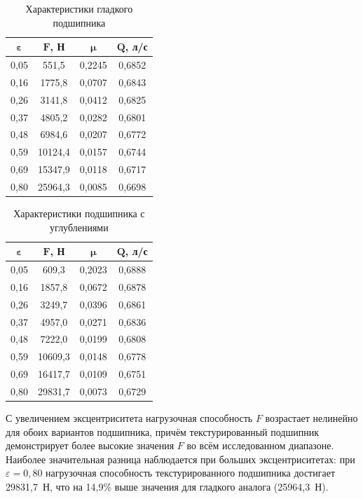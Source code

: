 \begin{table}[H]
\small
\centering
\caption{Характеристики гладкого подшипника}
\label{tab:smooth_results}
\begin{tabular}{|c|c|c|c|}
\hline
$\boldsymbol{\varepsilon}$ & $\boldsymbol{F}$\textbf{, Н} & $\boldsymbol{\mu}$ & $\boldsymbol{Q}$\textbf{, л/с} \\
\hline
0{,}05 & 551{,}5 & 0{,}2245 & 0{,}6852 \\
\hline
0{,}16 & 1775{,}8 & 0{,}0707 & 0{,}6843 \\
\hline
0{,}26 & 3141{,}8 & 0{,}0412 & 0{,}6825 \\
\hline
0{,}37 & 4805{,}2 & 0{,}0282 & 0{,}6801 \\
\hline
0{,}48 & 6984{,}6 & 0{,}0207 & 0{,}6772 \\
\hline
0{,}59 & 10124{,}4 & 0{,}0157 & 0{,}6744 \\
\hline
0{,}69 & 15347{,}9 & 0{,}0118 & 0{,}6717 \\
\hline
0{,}80 & 25964{,}3 & 0{,}0085 & 0{,}6698 \\
\hline
\end{tabular}
\end{table}

\begin{table}[H]
\small
\centering
\caption{Характеристики подшипника с \varDimpleTypeGenitive{} углублениями}
\label{tab:textured_results}
\begin{tabular}{|c|c|c|c|}
\hline
$\boldsymbol{\varepsilon}$ & $\boldsymbol{F}$\textbf{, Н} & $\boldsymbol{\mu}$ & $\boldsymbol{Q}$\textbf{, л/с} \\
\hline
0{,}05 & 609{,}3 & 0{,}2023 & 0{,}6888 \\
\hline
0{,}16 & 1857{,}8 & 0{,}0672 & 0{,}6878 \\
\hline
0{,}26 & 3249{,}7 & 0{,}0396 & 0{,}6861 \\
\hline
0{,}37 & 4957{,}0 & 0{,}0271 & 0{,}6836 \\
\hline
0{,}48 & 7222{,}0 & 0{,}0199 & 0{,}6808 \\
\hline
0{,}59 & 10609{,}3 & 0{,}0148 & 0{,}6778 \\
\hline
0{,}69 & 16417{,}7 & 0{,}0109 & 0{,}6751 \\
\hline
0{,}80 & 29831{,}7 & 0{,}0073 & 0{,}6729 \\
\hline
\end{tabular}
\end{table}

С увеличением эксцентриситета нагрузочная способность $F$ возрастает нелинейно для обоих вариантов подшипника, причём текстурированный подшипник демонстрирует более высокие значения $F$ во всём исследованном диапазоне. Наиболее значительная разница наблюдается при больших эксцентриситетах: при $\varepsilon = 0{,}80$ нагрузочная способность текстурированного подшипника достигает 29831{,}7~Н, что на 14{,}9\% выше значения для гладкого аналога (25964{,}3~Н).

